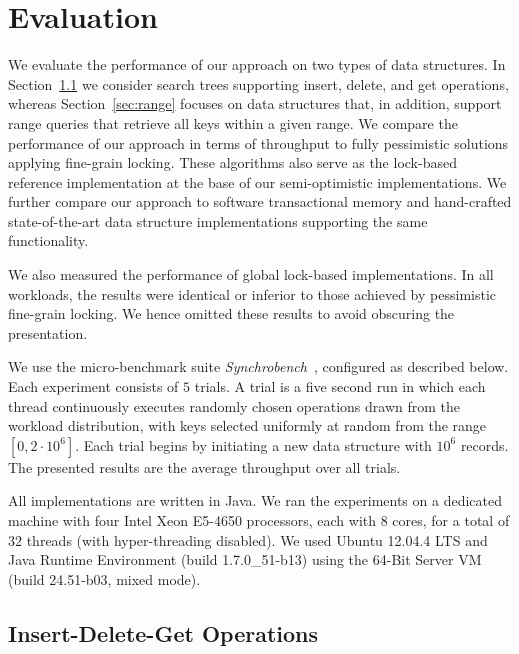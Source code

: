 \section{Evaluation}
\label{sec:eval}

We evaluate the performance of our approach on two types of data
structures. In Section~\ref{sec:readwrite} we consider search trees
supporting insert, delete, and get operations, whereas Section~\ref{sec:range}
focuses on data structures that, in addition, support range queries that retrieve all
keys within a given range. We compare the performance of our approach in terms of
throughput to fully pessimistic solutions applying fine-grain locking. These
algorithms also serve as the lock-based reference implementation at the base of
our semi-optimistic implementations.
We further
compare our approach to software transactional memory and hand-crafted state-of-the-art data structure
implementations supporting the same functionality.

We also measured the performance of global lock-based implementations.
In all workloads, the results were identical or inferior to those
achieved by pessimistic fine-grain locking. We hence
omitted these results to avoid obscuring the presentation.

We use the micro-benchmark suite \textit{Synchrobench}~\cite{Gramoli2015}, configured as described below. 
Each experiment
consists of $5$ trials. A trial is a five second run in which each thread continuously executes
randomly chosen operations drawn from the workload distribution, with keys
selected uniformly at random from the range $[0,2\cdot10^6]$.
Each trial begins by initiating a new data structure with
$10^6$ records. The presented results are the average throughput over all trials.

All implementations are written in Java. We ran the experiments on a dedicated machine with
four Intel Xeon E5-4650 processors, each with $8$ cores, for a total of $32$ threads
(with hyper-threading disabled).
We used Ubuntu 12.04.4 LTS and Java Runtime Environment (build
1.7.0\_51-b13) using the 64-Bit Server VM (build 24.51-b03, mixed mode).

\subsection{Insert-Delete-Get Operations}
\label{sec:readwrite}

